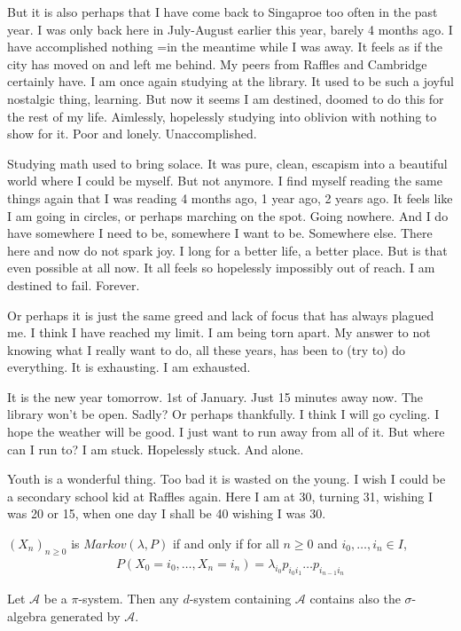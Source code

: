 \documentclass[hidelinks, 12pt]{article}
\theoremstyle{mydefstyle}
\theoremstyle{mythmstyle}
\begin{document}
But it is also perhaps that I have come back to Singaproe too often in the past year. I was only back here in July-August earlier this year, barely 4 months ago. I have accomplished nothing =in the meantime while I was away. It feels as if the city has moved on and left me behind. My peers from Raffles and Cambridge certainly have. I am once again studying at the library. It used to be such a joyful nostalgic thing, learning. But now it seems I am destined, doomed to do this for the rest of my life. Aimlessly, hopelessly studying into oblivion with nothing to show for it. Poor and lonely. Unaccomplished. 

Studying math used to bring solace. It was pure, clean, escapism into a beautiful world where I could be myself. But not anymore. I find myself reading the same things again that I was reading 4 months ago, 1 year ago, 2 years ago. It feels like I am going in circles, or perhaps marching on the spot. Going nowhere. And I do have somewhere I need to be, somewhere I want to be. Somewhere else. There here and now do not spark joy. I long for a better life, a better place. But is that even possible at all now. It all feels so hopelessly impossibly out of reach. I am destined to fail. Forever.                             

Or perhaps it is just the same greed and lack of focus that has always plagued me. I think I have reached my limit. I am being torn apart. My answer to not knowing what I really want to do, all these years, has been to (try to) do everything. It is exhausting. I am exhausted.

It is the new year tomorrow. 1st of January. Just 15 minutes away now. The library won't be open. Sadly? Or perhaps thankfully. I think I will go cycling. I hope the weather will be good. I just want to run away from all of it. But where can I run to? I am stuck. Hopelessly stuck. And alone.

Youth is a wonderful thing. Too bad it is wasted on the young. I wish I could be a secondary school kid at Raffles again. Here I am at 30, turning 31, wishing I was 20 or 15, when one day I shall be 40 wishing I was 30. 

$(X_n)_{n \ge 0}$ is $Markov(\lambda, P)$ if and only if for all $n \ge 0$ and $i_0, \dots, i_n \in I$,
\begin{gather*}
P(X_0 = i_0, \dots, X_n = i_n) = \lambda_{i_0} p_{i_0 i_1} \dots p_{i_{n-1} i_n}
\end{gather*}

Let $\mathcal{A}$ be a $\pi$-system. Then any $d$-system containing $\mathcal{A}$ contains also the $\sigma$-algebra generated by $\mathcal{A}$. 
\end{document}
